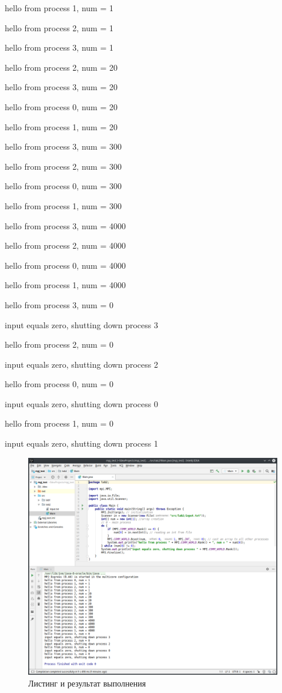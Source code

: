 \documentclass[titlepage,oneside,final,14pt]{extarticle} %
\begin{document}
hello from process 1, num = 1

hello from process 2, num = 1

hello from process 3, num = 1

hello from process 2, num = 20

hello from process 3, num = 20

hello from process 0, num = 20

hello from process 1, num = 20

hello from process 3, num = 300

hello from process 2, num = 300

hello from process 0, num = 300

hello from process 1, num = 300

hello from process 3, num = 4000

hello from process 2, num = 4000

hello from process 0, num = 4000

hello from process 1, num = 4000

hello from process 3, num = 0

input equals zero, shutting down process 3

hello from process 2, num = 0

input equals zero, shutting down process 2

hello from process 0, num = 0

input equals zero, shutting down process 0

hello from process 1, num = 0

input equals zero, shutting down process 1

\normalfont

\begin{figure}[H]
	\includegraphics[width=1\linewidth]{code_listing_results}
	\centering
	\caption{Листинг и результат выполнения}
\end{figure}
\end{document}

